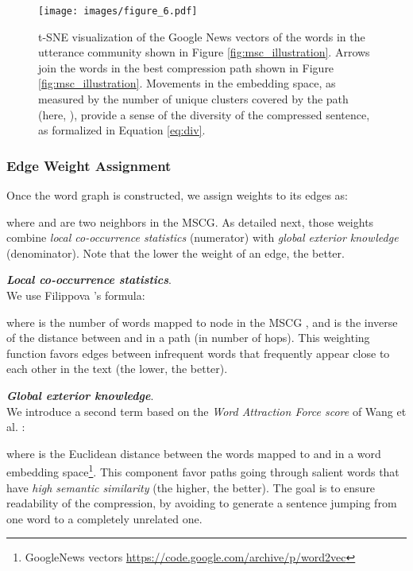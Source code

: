 \documentclass[11pt,a4paper]{article}
\begin{document}
\begin{figure*}[!ht]
\centering
\captionsetup{size=small}
\begin{minipage}[c]{0.38\textwidth}
\caption{
t-SNE visualization \cite{maaten2008visualizing} of the Google News vectors of the words in the utterance community shown in Figure \ref{fig:msc_illustration}. Arrows join the words in the best compression path shown in Figure \ref{fig:msc_illustration}. Movements in the embedding space, as measured by the number of unique clusters covered by the path (here, ), provide a sense of the diversity of the compressed sentence, as formalized in Equation \ref{eq:div}.
} \label{fig:div_illustration}
\end{minipage}\hfill
\begin{minipage}[c]{0.6\textwidth}
\texttt{[image: images/figure\_6.pdf]}
\end{minipage}

\end{figure*}

\subsubsection*{Edge Weight Assignment}
Once the word graph is constructed, we assign weights to its edges as: 

\label{eq:e_w}

\noindent where  and  are two neighbors in the MSCG. As detailed next, those weights combine \textit{local co-occurrence statistics} (numerator) with \textit{global exterior knowledge} (denominator). Note that the lower the weight of an edge, the better.

\textbf{\textit{Local co-occurrence statistics}}. \\
We use Filippova 's formula:

where  is the number of words mapped to node  in the MSCG , and  is the inverse of the distance between  and  in a path  (in number of hops). This weighting function favors edges between infrequent words that frequently appear close to each other in the text (the lower, the better).

\textbf{\textit{Global exterior knowledge}}. \\
We introduce a second term based on the \textit{Word Attraction Force score} of Wang et al. :

where  is the Euclidean distance between the words mapped to  and  in a word embedding space\footnote{\tiny{GoogleNews vectors \url{https://code.google.com/archive/p/word2vec}}}. This component favor paths going through salient words that have \textit{high semantic similarity} (the higher, the better). The goal is to ensure readability of the compression, by avoiding to generate a sentence jumping from one word to a completely unrelated one.
\end{document}
